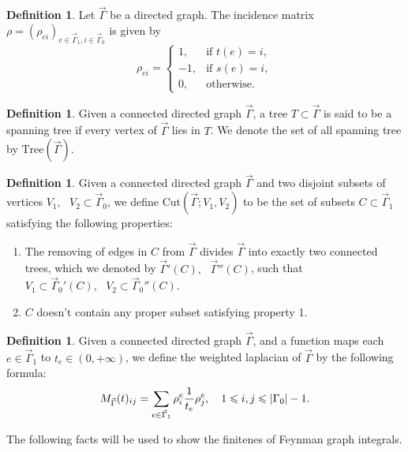 \documentclass[11pt]{amsart}
\theoremstyle{definition}
\newtheorem{defn}[thm]{Definition}
\theoremstyle{remark}
\numberwithin{equation}{section}
\begin{document}
\begin{defn}
    Let $\vec{\Gamma}$ be a directed graph. The incidence matrix $\rho=(\rho_{ei})_{e\in\vec{\Gamma}_{1},i\in\vec{\Gamma}_{0}}$ is given by
    $$
    \rho_{ei}=
    \begin{cases}
        1, &\text{if }t(e)=i,\\
        -1, &\text{if }s(e)=i,\\
        0, &\text{otherwise.}
    \end{cases}
    $$
\end{defn}

\begin{defn}
  Given a connected directed graph $\vec{\Gamma}$, a tree $T \subset \vec{\Gamma}$ is
  said to be a spanning tree if every vertex of $\vec{\Gamma}$ lies in $T$. We
  denote the set of all spanning tree by $\mathrm{Tree} (\vec{\Gamma})$.
\end{defn}

\begin{defn}
  Given a connected directed graph $\vec{\Gamma}$ and two
  disjoint subsets of vertices $V_1, \text{ } V_2 \subset \vec{\Gamma}_0$, we
  define $\mathrm{Cut} (\vec{\Gamma} ; V_1, V_2)$ to be the set of subsets $C
  \subset \vec{\Gamma}_1$ satisfying the following properties:
  \begin{enumerate}
    \item The removing of edges in $C$ from $\vec{\Gamma}$ divides $\vec{\Gamma}$ into
    exactly two connected trees, which we denoted by $\vec{\Gamma}' (C), \text{ }
    \vec{\Gamma}'' (C) $, such that $V_1 \subset \vec{\Gamma}_0' (C), \text{ } V_2
    \subset \vec{\Gamma}_0'' (C)$.
    
    \item $C$ doesn't contain any proper subset satisfying property 1.
  \end{enumerate}
\end{defn}

\begin{defn}
  Given a connected directed graph $\vec{\Gamma}$, and a function
  maps each $e \in \vec{\Gamma}_1$ to $t_e \in (0, + \infty)$, we define the
  {{weighted laplacian}} of $\vec{\Gamma}$ by the following formula:
  \[ M_{\vec{\Gamma}} (t)_{ij} = \sum_{e \in \vec{\Gamma}_1} \rho^e_i \frac{1}{t_e}
     \rho_j^e, \text{\quad} 1 \leqslant i, j \leqslant | \Gamma_0 | - 1. \]
\end{defn}

The following facts will be used to show the finitenes of Feynman graph
integrals.
\end{document}
